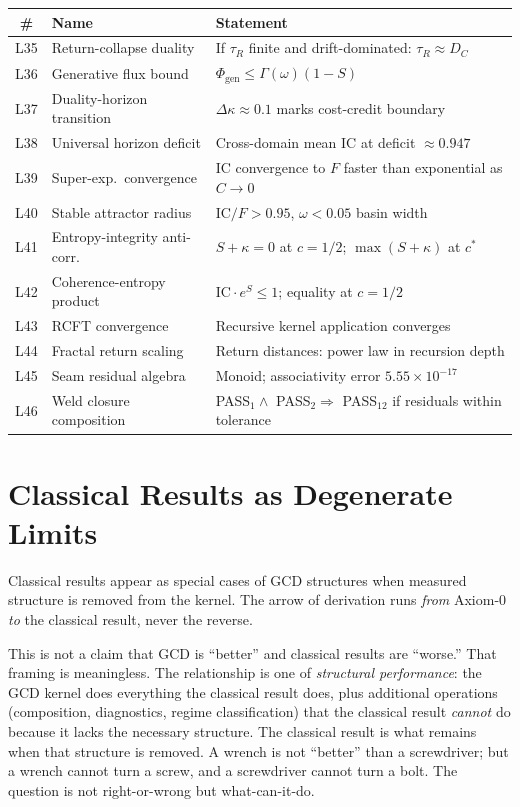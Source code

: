 \documentclass[
  aps,
  prd,
  twocolumn,
  superscriptaddress,
  nofootinbib,
  floatfix
]{revtex4-2}
\newcommand{\tR}{\tau_{\!R}}
\newcommand{\Gam}{\Gamma}
\newcommand{\IC}{\mathrm{IC}}
\begin{document}
{\small
\begin{center}
\begin{tabular}{@{}clP{3.5cm}@{}}
\toprule
\# & Name & Statement \\
\midrule
L35 & Return-collapse duality &
  If $\tR$ finite and drift-dominated: $\tR \approx D_C$ \\
L36 & Generative flux bound &
  $\Phi_\mathrm{gen} \leq \Gam(\omega)(1{-}S)$ \\
L37 & Duality-horizon transition &
  $\Delta\kappa \approx 0.1$ marks cost-credit boundary \\
L38 & Universal horizon deficit &
  Cross-domain mean $\IC$ at deficit $\approx 0.947$ \\
L39 & Super-exp.\ convergence &
  IC convergence to $F$ faster than exponential as
  $C \to 0$ \\
L40 & Stable attractor radius &
  $\IC/F > 0.95$, $\omega < 0.05$ basin width \\
L41 & Entropy-integrity anti-corr. &
  $S + \kappa = 0$ at $c = 1/2$;
  $\max(S{+}\kappa)$ at $c^*$ \\
L42 & Coherence-entropy product &
  $\IC \cdot e^S \leq 1$; equality at $c = 1/2$ \\
L43 & RCFT convergence &
  Recursive kernel application converges \\
L44 & Fractal return scaling &
  Return distances: power law in recursion depth \\
L45 & Seam residual algebra &
  Monoid; associativity error
  $5.55 \times 10^{-17}$ \\
L46 & Weld closure composition &
  PASS$_1 \wedge$ PASS$_2 \Rightarrow$ PASS$_{12}$
  if residuals within tolerance \\
\bottomrule
\end{tabular}
\end{center}}


\section{Classical Results as Degenerate Limits}
\label{sec:degenerate}

Classical results appear as special cases of GCD structures when
measured structure is removed from the kernel.  The arrow of
derivation runs \emph{from} Axiom-0 \emph{to} the classical
result, never the reverse.

This is not a claim that GCD is ``better'' and classical
results are ``worse.''  That framing is meaningless.  The
relationship is one of \emph{structural performance}: the GCD
kernel does everything the classical result does, plus additional
operations (composition, diagnostics, regime classification)
that the classical result \emph{cannot} do because it lacks the
necessary structure.  The classical result is what remains when
that structure is removed.  A wrench is not ``better'' than a
screwdriver; but a wrench cannot turn a screw, and a screwdriver
cannot turn a bolt.  The question is not right-or-wrong but
what-can-it-do.
\end{document}
